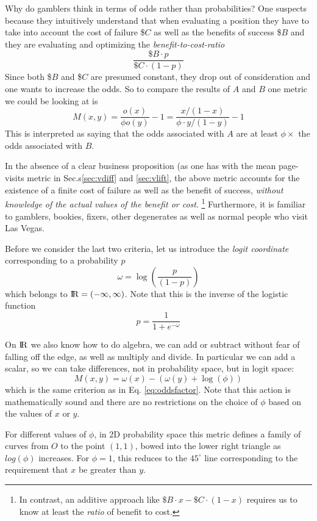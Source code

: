 \documentclass[12pt]{report}
\newcommand{\beq}{\begin{equation}} %
\newcommand{\eeq}{\end{equation}} %
\newcommand{\bdm}{\begin{displaymath}} %
\newcommand{\edm}{\end{displaymath}} %
\newcommand{\reals}{{\rm I\! R}} %
\begin{document}
Why do gamblers think in terms of odds rather than probabilities? One suspects
because they intuitively understand that when evaluating a position
they have to take into account the cost of failure \$\(C\) as well as the
benefits of success \$\(B\) and they are evaluating and optimizing the
{\it benefit-to-cost-ratio}
\bdm
\frac{\$B \cdot p}{\$C \cdot (1-p)}
\edm
Since both \$\(B\) and \$\(C\) are presumed constant, they drop out of
consideration and one wants to increase the odds.
So to compare the results of \(A\) and \(B\) one metric we could be looking at
is
\beq
\label{eq:oddsfactor}
M(x,y) = \frac{o(x)}{\phi o(y)} -1 = \frac{x/(1-x)}{\phi\cdot y/(1-y)}-1
\eeq
This is interpreted as saying that the odds associated with \(A\) are at
least \(\phi \times\) the odds associated with \(B\).

In the absence of a clear business proposition (as one has with the
mean page-visits metric in Sec.s\ref{sec:vdiff} and \ref{sec:vlift},
the above metric accounts for the existence of a finite cost of
failure as well as the benefit of success, {\em without knowledge of
  the actual values of the benefit or cost}. \footnote{In contrast, an
  additive approach like \(\$B\cdot x - \$C\cdot(1-x)\) requires us to
  know at least the {\em ratio} of benefit to cost.}  Furthermore, it
is familiar to gamblers, bookies, fixers, other degenerates as well as
normal people who visit Las Vegas.

Before we consider the last two criteria, let us introduce the
{\it logit coordinate}
corresponding to a probability \(p\)
\bdm
\omega = \log(\frac{p}{(1-p)})
\edm
which belongs to \(\reals=(-\infty, \infty)\). Note that this is the
inverse of the logistic function
\bdm
p=\frac{1}{1+e^{-\omega}}
\edm

On \(\reals\)
we also know how to do algebra, we can
add or subtract without fear of falling off the edge, as well as multiply
and divide. In particular we can add a scalar, so we can take differences,
not in probability space, but in logit space:
\bdm
M(x,y) = \omega(x) -(\omega(y) + \log(\phi))
\edm
which is the same criterion as in Eq. \ref{eq:oddsfactor}.
Note that this action is mathematically sound and there are no restrictions on
the choice of \(\phi\) based on the values of \(x\) or \(y\).

For different values of \(\phi\), in 2D probability space this metric
defines a family of curves from \(O\) to the point \((1,1)\), bowed into the
lower right triangle as \(log(\phi)\) increases. For \(\phi=1\), this
reduces to the \(45^\circ\) line corresponding to the requirement that
\(x\) be greater than \(y\). 
\end{document}
